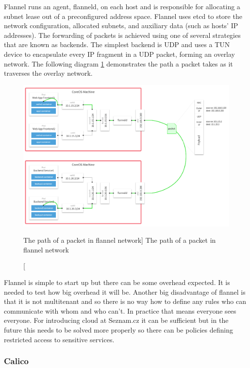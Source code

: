 Flannel runs an agent, flanneld, on each host and is responsible for allocating a subnet lease out of a preconfigured address space. Flannel uses etcd to store the network configuration, allocated subnets, and auxiliary data (such as hosts' IP addresses). The forwarding of packets is achieved using one of several strategies that are known as backends. The simplest backend is UDP and uses a TUN device to encapsulate every IP fragment in a UDP packet, forming an overlay network. The following diagram \ref{fig:flannel} demonstrates the path a packet takes as it traverses the overlay network. \cite{flannel}
                              
\begin{figure}[htb]\centering
  \includegraphics[width=1\textwidth]{images/flannel.png}
  \caption
    [The path of a packet in flannel network]
    {The path of a packet in flannel network \cite{flannel}}
  \label{fig:flannel}
\end{figure}

Flannel is simple to start up but there can be some overhead expected. It is needed to test how big overhead it will be. Another big disadvantage of flannel is that it is not multitenant and so there is no way how to define any rules who can communicate with whom and who can’t. In practice that means everyone sees everyone. For introducing cloud at Seznam.cz it can be sufficient but in the future this needs to be solved more properly so there can be policies defining restricted access to sensitive services.

\subsubsection{Calico}


